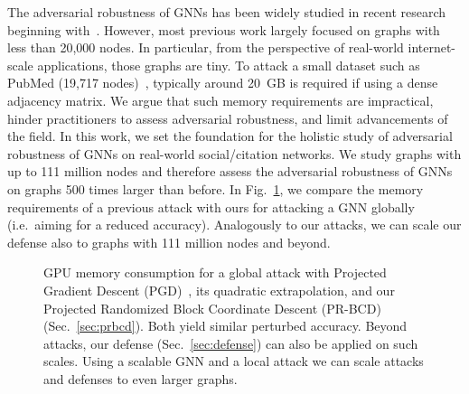 \documentclass[sigconf, review]{acmart}
\begin{document}
The adversarial robustness of GNNs has been widely studied in recent research beginning with~\citep{Zugner2018, Dai2018}. However, most previous work largely focused on graphs with less than 20,000 nodes. In particular, from the perspective of real-world internet-scale applications, those graphs are tiny. To attack a small dataset such as PubMed (19,717 nodes)~\citep{Sen2008}, typically around 20~GB is required if using a dense adjacency matrix. We argue that such memory requirements are impractical, hinder practitioners to assess adversarial robustness, and limit advancements of the field. In this work, we set the foundation for the holistic study of adversarial robustness of GNNs on real-world social/citation networks. 
We study graphs with up to 111 million nodes and therefore assess the adversarial robustness of GNNs on graphs 500 times larger than before. In Fig.~\ref{fig:memorycomparison}, we compare the memory requirements of a previous attack with ours for attacking a GNN globally (i.e.\ aiming for a reduced accuracy). Analogously to our attacks, we can scale our defense also to graphs with 111 million nodes and beyond.


\begin{figure}[h]
  \centering
  \resizebox{0.8\linewidth}{!}{}
  \caption{GPU memory consumption for a global attack with Projected Gradient Descent (PGD)~\citep{Xu2019a}, its quadratic extrapolation, and our Projected Randomized Block Coordinate Descent (PR-BCD) (Sec.~\ref{sec:prbcd}). 
  Both yield similar perturbed accuracy.
  Beyond attacks, our defense %
  (Sec.~\ref{sec:defense}) can also be applied on such scales. Using a scalable GNN and a local attack we can scale attacks and defenses to even larger graphs. \label{fig:memorycomparison}}
\end{figure}

\end{document}
